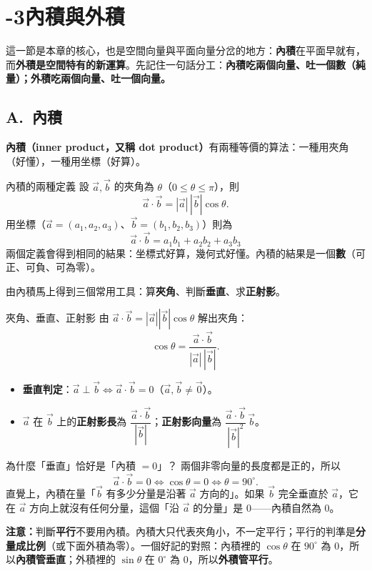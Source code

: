 \documentclass[11pt]{article}
\begin{document}
\section*{-3\quad 內積與外積}

這一節是本章的核心，也是空間向量與平面向量分岔的地方：\textbf{內積}在平面早就有，而\textbf{外積是空間特有的新運算}。先記住一句話分工：\textbf{內積吃兩個向量、吐一個數（純量）；外積吃兩個向量、吐一個向量。}

\subsection*{\sffamily A.\ 內積}

\textbf{內積（inner product，又稱 dot product）}有兩種等價的算法：一種用夾角（好懂），一種用坐標（好算）。

\begin{補充框}{內積的兩種定義}
設 $\vec a,\vec b$ 的夾角為 $\theta$（$0\le\theta\le\pi$），則
$$\vec a\cdot\vec b=|\vec a|\,|\vec b|\cos\theta.$$
用坐標（$\vec a=(a_1,a_2,a_3)$、$\vec b=(b_1,b_2,b_3)$）則為
$$\boxed{\;\vec a\cdot\vec b=a_1b_1+a_2b_2+a_3b_3\;}$$
兩個定義會得到相同的結果：坐標式好算，幾何式好懂。內積的結果是一個\textbf{數}（可正、可負、可為零）。
\end{補充框}

由內積馬上得到三個常用工具：算\textbf{夾角}、判斷\textbf{垂直}、求\textbf{正射影}。

\begin{補充框}{夾角、垂直、正射影}
由 $\vec a\cdot\vec b=|\vec a||\vec b|\cos\theta$ 解出夾角：
$$\cos\theta=\frac{\vec a\cdot\vec b}{|\vec a|\,|\vec b|}.$$
\begin{itemize}\setlength{\itemsep}{1pt}
\item \textbf{垂直判定}：$\vec a\perp\vec b\iff\vec a\cdot\vec b=0$（$\vec a,\vec b\ne\vec 0$）。
\item $\vec a$ 在 $\vec b$ 上的\textbf{正射影長}為 $\dfrac{\vec a\cdot\vec b}{|\vec b|}$；\textbf{正射影向量}為 $\dfrac{\vec a\cdot\vec b}{|\vec b|^2}\,\vec b$。
\end{itemize}
\end{補充框}

\begin{補充框}{為什麼「垂直」恰好是「內積 $=0$」？}
兩個非零向量的長度都是正的，所以
$$\vec a\cdot\vec b=0\iff\cos\theta=0\iff\theta=90^\circ.$$
直覺上，內積在量「$\vec b$ 有多少分量是沿著 $\vec a$ 方向的」。如果 $\vec b$ 完全垂直於 $\vec a$，它在 $\vec a$ 方向上就沒有任何分量，這個「沿 $\vec a$ 的分量」是 $0$——內積自然為 $0$。

\textbf{注意：}判斷\textbf{平行}不要用內積。內積大只代表夾角小，不一定平行；平行的判準是\textbf{分量成比例}（或下面外積為零）。一個好記的對照：內積裡的 $\cos\theta$ 在 $90^\circ$ 為 $0$，所以\textbf{內積管垂直}；外積裡的 $\sin\theta$ 在 $0^\circ$ 為 $0$，所以\textbf{外積管平行}。
\end{補充框}
\end{document}
